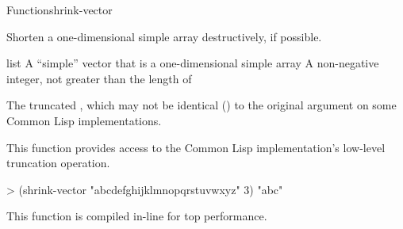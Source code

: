\documentclass[10pt,twoside,english,pdftex]{article}
\newcommand{\inline}{This function is compiled in-line for top performance.}
\begin{document}

\begin{functiondoc}{Function}{shrink-vector}{
    \returns{} } 
  
\fnsyntax

\fnpurpose Shorten a one-dimensional simple array destructively, if 
possible.

\fnpackage {}

\fnmodule {}

\fnargs
\begin{args}{list}
\arg[vector] A ``simple'' vector that is a one-dimensional simple array
\arg[length] A non-negative integer, not greater than the length of
\end{args}

\fnreturns The truncated , which may not be identical ()
to the original  argument on some Common Lisp implementations.

\fndescription This function provides access to the Common Lisp
implementation's low-level truncation operation.

\fnexample
%
\W\supp
\begin{example}
> (shrink-vector "abcdefghijklmnopqrstuvwxyz" 3)
"abc"
\end{example}

\fnnote \inline

\end{functiondoc}

\end{document}
